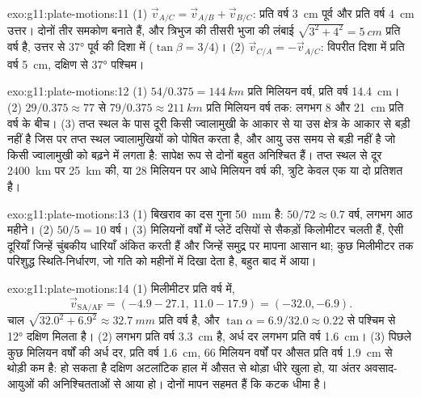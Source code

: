 \begin{solution}{exo:g11:plate-motions:11}
(1) $\vec v_{A/C} = \vec v_{A/B} + \vec v_{B/C}$: प्रति वर्ष \qty{3}{cm} पूर्व और
प्रति वर्ष \qty{4}{cm} उत्तर। दोनों तीर समकोण बनाते हैं, और त्रिभुज की तीसरी
भुजा की लंबाई $\sqrt{3^2 + 4^2} = \qty{5}{cm}$ प्रति वर्ष है,
उत्तर से \ang{37} पूर्व की दिशा में ($\tan\beta = 3/4$)। (2) $\vec v_{C/A}
= -\vec v_{A/C}$: विपरीत दिशा में प्रति वर्ष \qty{5}{cm}, दक्षिण से \ang{37}
पश्चिम।
\end{solution}

\begin{solution}{exo:g11:plate-motions:12}
(1) $54/0.375 = \qty{144}{km}$ प्रति मिलियन वर्ष, प्रति वर्ष \qty{14.4}{cm}। (2)
$29/0.375 \approx 77$ से $79/0.375 \approx \qty{211}{km}$ प्रति मिलियन
वर्ष तक: लगभग 8 और \qty{21}{cm} प्रति वर्ष के बीच। (3) तप्त स्थल के पास
दूरी किसी ज्वालामुखी के आकार से या उस क्षेत्र के आकार से बड़ी नहीं है जिस पर
तप्त स्थल ज्वालामुखियों को पोषित करता है, और आयु उस समय से बड़ी नहीं है जो किसी ज्वालामुखी को
बढ़ने में लगता है: सापेक्ष रूप से दोनों बहुत अनिश्चित हैं। तप्त स्थल से दूर
\qty{2400}{km} पर \qty{25}{km} की, या 28 मिलियन पर आधे मिलियन वर्ष की, त्रुटि
केवल एक या दो प्रतिशत है।
\end{solution}

\begin{solution}{exo:g11:plate-motions:13}
(1) बिखराव का दस गुना \qty{50}{mm} है: $50/72 \approx 0.7$ वर्ष, लगभग
आठ महीने। (2) $50/5 = 10$ वर्ष। (3) मिलियनों वर्षों में प्लेटें
दसियों से सैकड़ों किलोमीटर चलती हैं, ऐसी दूरियाँ जिन्हें चुंबकीय धारियाँ अंकित करती हैं और
जिन्हें समुद्र पर मापना आसान था; कुछ मिलीमीटर तक परिशुद्ध स्थिति-निर्धारण,
जो गति को महीनों में दिखा देता है, बहुत बाद में आया।
\end{solution}

\begin{solution}{exo:g11:plate-motions:14}
(1) मिलीमीटर प्रति वर्ष में,
\[
  \vec v_{\mathrm{SA/AF}} = (-4.9 - 27.1,\ 11.0 - 17.9) = (-32.0, -6.9).
\] चाल $\sqrt{32.0^2 + 6.9^2} \approx
\qty{32.7}{mm}$ प्रति वर्ष है, और $\tan\alpha = 6.9/32.0 \approx 0.22$ से
पश्चिम से \ang{12} दक्षिण मिलता है। (2)  लगभग प्रति वर्ष \qty{3.3}{cm}
है, अर्ध दर लगभग प्रति वर्ष \qty{1.6}{cm}। (3) पिछले
कुछ मिलियन वर्षों की अर्ध दर, प्रति वर्ष \qty{1.6}{cm}, 66 मिलियन वर्षों पर औसत
प्रति वर्ष \qty{1.9}{cm} से थोड़ी कम है: हो सकता है दक्षिण अटलांटिक
हाल में औसत से थोड़ा धीरे खुला हो, या अंतर
अवसाद-आयुओं की अनिश्चितताओं से आया हो। दोनों मापन सहमत हैं
कि कटक धीमा है।
\end{solution}

